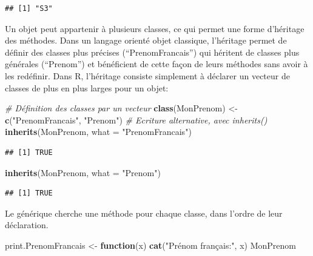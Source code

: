 \documentclass[
  12pt,
  french,
  a4paper,
  extrafontsizes,onecolumn,openright
  ]{memoir}
\newenvironment{Shaded}{\begin{snugshade}}{\end{snugshade}}
\newcommand{\AttributeTok}[1]{\textcolor[rgb]{0.13,0.29,0.53}{#1}}
\newcommand{\CommentTok}[1]{\textcolor[rgb]{0.56,0.35,0.01}{\textit{#1}}}
\newcommand{\ControlFlowTok}[1]{\textcolor[rgb]{0.13,0.29,0.53}{\textbf{#1}}}
\newcommand{\FunctionTok}[1]{\textcolor[rgb]{0.13,0.29,0.53}{\textbf{#1}}}
\newcommand{\NormalTok}[1]{#1}
\newcommand{\OtherTok}[1]{\textcolor[rgb]{0.56,0.35,0.01}{#1}}
\newcommand{\StringTok}[1]{\textcolor[rgb]{0.31,0.60,0.02}{#1}}
\begin{document}
\begin{verbatim}
## [1] "S3"
\end{verbatim}

\normalsize

Un objet peut appartenir à plusieurs classes, ce qui permet une forme d'héritage des méthodes.
Dans un langage orienté objet classique, l'héritage permet de définir des classes plus précises (\enquote{PrenomFrancais}) qui héritent de classes plus générales (\enquote{Prenom}) et bénéficient de cette façon de leurs méthodes sans avoir à les redéfinir.
Dans R, l'héritage consiste simplement à déclarer un vecteur de classes de plus en plus larges pour un objet:

\scriptsize

\begin{Shaded}
\begin{Highlighting}[]
\CommentTok{\# Définition des classes par un vecteur}
\FunctionTok{class}\NormalTok{(MonPrenom) }\OtherTok{\textless{}{-}} \FunctionTok{c}\NormalTok{(}\StringTok{"PrenomFrancais"}\NormalTok{, }\StringTok{"Prenom"}\NormalTok{)}
\CommentTok{\# Ecriture alternative, avec inherits()}
\FunctionTok{inherits}\NormalTok{(MonPrenom, }\AttributeTok{what =} \StringTok{"PrenomFrancais"}\NormalTok{)}
\end{Highlighting}
\end{Shaded}

\begin{verbatim}
## [1] TRUE
\end{verbatim}

\begin{Shaded}
\begin{Highlighting}[]
\FunctionTok{inherits}\NormalTok{(MonPrenom, }\AttributeTok{what =} \StringTok{"Prenom"}\NormalTok{)}
\end{Highlighting}
\end{Shaded}

\begin{verbatim}
## [1] TRUE
\end{verbatim}

\normalsize

Le générique cherche une méthode pour chaque classe, dans l'ordre de leur déclaration.

\scriptsize

\begin{Shaded}
\begin{Highlighting}[]
\NormalTok{print.PrenomFrancais }\OtherTok{\textless{}{-}} \ControlFlowTok{function}\NormalTok{(x) }\FunctionTok{cat}\NormalTok{(}\StringTok{"Prénom français:"}\NormalTok{, x) }
\NormalTok{MonPrenom}
\end{Highlighting}
\end{Shaded}
\end{document}
